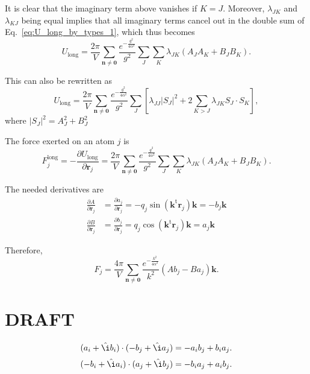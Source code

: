 \documentclass[11pt]{article}
\newcommand{\vt}[1]{\boldsymbol{\mathbf{#1}}}           %
\newcommand{\tr}[1]{#1^\text{t}}                        %
\newcommand{\im}{\hat{\i}}                              %
\begin{document}
It is clear that the imaginary term above vanishes if $K = J$. Moreover, $\lambda_{JK}$ and $\lambda_{KJ}$ being equal implies that all imaginary terms cancel out in the double sum of Eq.~\ref{eq:U_long_by_types_1}, which thus becomes
\begin{equation*}
U_\text{long} = \frac{2\pi}{V}\sum_{\vt n \neq \vt 0} \frac{e^{-\frac{g^2}{4\alpha^2}}}{g^2} \sum_J \sum_K \lambda_{JK} (A_J A_K + B_J B_K).
\end{equation*}

This can also be rewritten as
\begin{equation*}
U_\text{long} = \frac{2\pi}{V}\sum_{\vt n \neq \vt 0} \frac{e^{-\frac{g^2}{4\alpha^2}}}{g^2} \sum_J \left[\lambda_{JJ} |S_J|^2 + 2 \sum_{K>J} \lambda_{JK} S_J \cdot S_K\right],
\end{equation*}
where $|S_J|^2 = A_J^2 + B_J^2$


The force exerted on an atom $j$ is
\begin{equation*}
F_j^\text{long} = -\frac{\partial U_\text{long}}{\partial \vt r_j} = \frac{2\pi}{V}\sum_{\vt n \neq \vt 0} \frac{e^{-\frac{g^2}{4\alpha^2}}}{g^2} \sum_J \sum_K \lambda_{JK} (A_J A_K + B_J B_K).
\end{equation*}

The needed derivatives are
\begin{align*}
\frac{\partial A}{\partial \vt r_j} &= \frac{\partial a_j}{\partial \vt r_j} = -q_j \sin(\tr{\vt k}{\vt r}_j){\vt k} = -b_j{\vt k} \\
\frac{\partial B}{\partial \vt r_j} &= \frac{\partial b_j}{\partial \vt r_j} = q_j \cos(\tr{\vt k}{\vt r}_j){\vt k} = a_j{\vt k}
\end{align*}

Therefore,
\begin{equation*}
F_j = \frac{4\pi}{V}\sum_{\vt n \neq \vt 0} \frac{e^{-\frac{k^2}{4\alpha^2}}}{k^2} \left( A b_j - B a_j \right){\vt k}.
\end{equation*}

\section{DRAFT}
\begin{equation*}
(a_i + \im b_i)\cdot(-b_j + \im a_j) = -a_i b_j + b_i a_j.
\end{equation*}
\begin{equation*}
(-b_i + \im a_i)\cdot(a_j + \im b_j) = -b_i a_j + a_i b_j.
\end{equation*}
\end{document}
